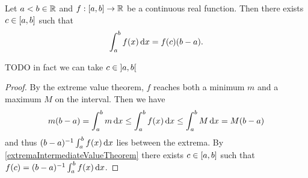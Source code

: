 \begin{proposition} \label{meanValueTheoremIntegrals}
Let $a<b\in \mathbb{R}$ and $f:\interval{a,b}\to \R$ be a continuous real function. Then there exists $c\in \interval{a,b}$ such that
\[ \int_a^bf(x)\operatorname{d \!}{x} = f(c)(b-a). \]
\end{proposition}
TODO in fact we can take $c\in \interval[o]{a,b}$
\begin{proof}
By the extreme value theorem, $f$ reaches both a minimum $m$ and a maximum $M$ on the interval. Then we have
\[ m(b-a) = \int_a^bm\operatorname{d \!}{x} \leq \int_a^bf(x)\operatorname{d \!}{x} \leq \int_a^bM\operatorname{d \!}{x} = M(b-a) \]
and thus $(b-a)^{-1}\int_a^bf(x)\operatorname{d \!}{x}$ lies between the extrema. By \ref{extremaIntermediateValueTheorem} there exists $c\in \interval{a,b}$ such that $f(c) = (b-a)^{-1}\int_a^bf(x)\operatorname{d \!}{x}$.
\end{proof}

